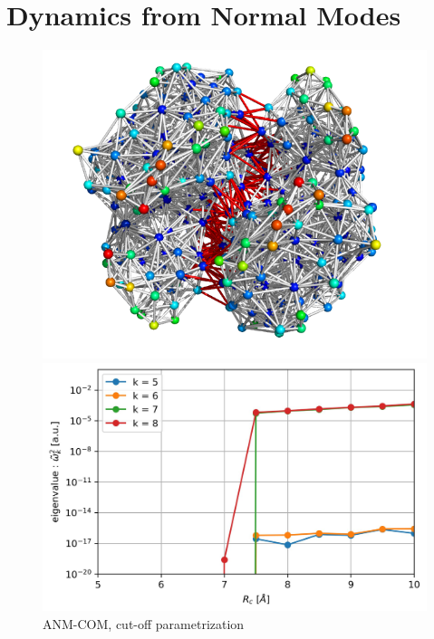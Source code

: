 \section{Dynamics from Normal Modes}
\begin{figure}[h!]
	\label{ANM-COM Rc param}
	\begin{minipage}{.48\linewidth}
		\includegraphics[width = .99\textwidth]{figures/GSTD1_ElasticNetwork.png}		
	\end{minipage}
	\begin{minipage}{.48\linewidth}
		\includegraphics[width = .99\textwidth]{figures/GSTD1_ANM-COM_Rc_param}
	\end{minipage}
	\caption{ANM-COM, cut-off parametrization}
\end{figure}
